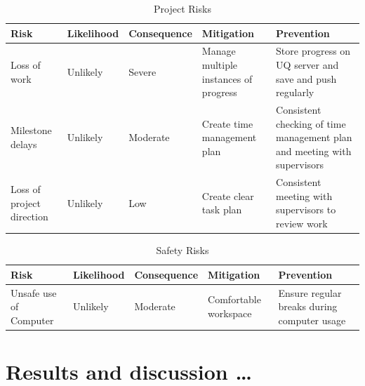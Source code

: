 \documentclass[12pt,openany,a4paper]{book}
\newcommand{\tab}[1]  {Table~\ref{#1}}		%
\begin{document}
\begin{table}[h]
    \centering
    \begin{tabular}{ |p{2cm}|p{2.1cm}|p{2.6cm}|p{4cm}|p{4cm}| }
        \hline
        \textbf{Risk} & \textbf{Likelihood} & \textbf{Consequence} & \textbf{Mitigation} & \textbf{Prevention}\\
        \hline
        Loss of work & Unlikely & Severe & Manage multiple instances of progress & Store progress on UQ server and save and push regularly\\
        \hline
        Milestone delays & Unlikely & Moderate & Create time management plan & Consistent checking of time management plan and meeting with supervisors\\
        \hline
        Loss of project direction & Unlikely & Low & Create clear task plan & Consistent meeting with supervisors to review work\\
        \hline
    \end{tabular}
    \caption{Project Risks}
    \label{project-risk-table}
\end{table}

\begin{table}[h]
    \centering
    \begin{tabular}{ |p{2cm}|p{2.1cm}|p{2.6cm}|p{4cm}|p{4cm}| }
        \hline
        \textbf{Risk} & \textbf{Likelihood} & \textbf{Consequence} & \textbf{Mitigation} & \textbf{Prevention}\\
        \hline
        Unsafe use of Computer & Unlikely & Moderate & Comfortable workspace & Ensure regular breaks during computer usage\\
        \hline
    \end{tabular}
    \caption{Safety Risks}
    \label{safety-risk-table}
\end{table}
\chapter{Results and discussion \ldots}
% 
% 
% 
% 
\end{document}
